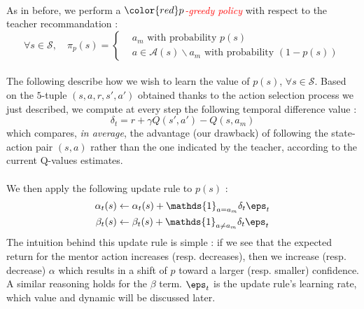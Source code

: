 \documentclass[a4paper]{report}
\begin{document}
{{{{			\paragraph{} As in before, we perform a $\color{red}p$\textcolor{red}{\emph{-greedy policy}} with respect to the teacher recommandation : 
			\begin{equation}
				\forall s\in\mathcal{S}, \quad \pi_p(s) = 
					\left\{ 
					\begin{aligned}
						&a_m \text{ with probability } p(s) \\
						& a\in\mathcal{A}(s)\backslash{a_m} \text{ with probability } (1-p(s))
					\end{aligned}
					\right. 
			\end{equation}
		
			\paragraph{} The following describe how we wish to learn the value of $p(s)$, $\forall s\in\mathcal{S}$. Based on the $5$-tuple $(s,a,r,s',a')$ obtained thanks to the action selection process we just described, we compute at every step the following temporal difference value : 
			\begin{equation}
				\delta_t = r + \gamma Q(s',a') - Q(s,a_m)
			\end{equation}
			which compares, \emph{in average}, the advantage (our drawback) of following the state-action pair $(s,a)$ rather than the one indicated by the teacher, according to the current Q-values estimates. 
		
			\paragraph{} We then apply the following update rule to $p(s)$ : 
			\begin{equation}
				\label{eq::update_rule}
				\begin{aligned}
					\alpha_t(s) &\leftarrow \alpha_t(s) +  \mathds{1}_{a=a_m}\delta_t \eps_t\\
					\beta_t(s) &\leftarrow \beta_t(s) +   \mathds{1}_{a\neq a_m}\delta_t \eps_t
				\end{aligned}
			\end{equation}
			The intuition behind this update rule is simple : if we see that the expected return for the mentor action increases (resp. decreases), then we increase (resp. decrease) $\alpha$ which results in a shift of $p$ toward a larger (resp. smaller) confidence. A similar reasoning holds for the $\beta$ term.  $\eps_t$ is the update rule's learning rate, which value and dynamic will be discussed later. 
		
}}}}
\end{document}
